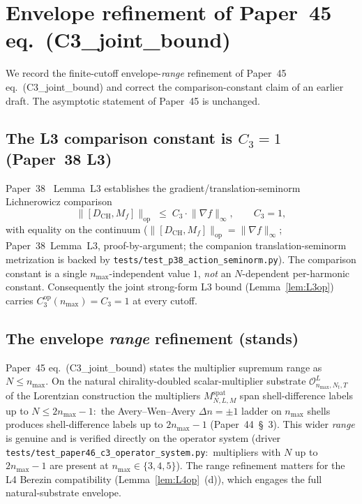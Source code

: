 \documentclass[11pt,a4paper]{article}
\theoremstyle{plain}
\theoremstyle{definition}
\newcommand{\nmax}{n_{\max}}
\newcommand{\Nt}{N_{t}}
\newcommand{\Op}{\mathcal{O}}
\newcommand{\opnorm}[1]{\lVert #1 \rVert_{\mathrm{op}}}
\newcommand{\norm}[1]{\lVert #1 \rVert}
\newcommand{\DCH}{D_{\mathrm{CH}}}
\newcommand{\Cthreeop}{C_{3}^{\mathrm{op}}}
\newcommand{\spat}{\mathrm{spat}}
\begin{document}
\appendix
\section{Envelope refinement of Paper~45 eq.~(C3\_joint\_bound)}
\label{app:correction}

We record the finite-cutoff envelope-\emph{range} refinement of Paper~45
eq.~(C3\_joint\_bound) and correct the comparison-constant claim of an
earlier draft. The asymptotic statement of Paper~45 is unchanged.

\subsection{The L3 comparison constant is $C_{3} = 1$ (Paper~38 L3)}
\label{app:correction_statement}

Paper~38~\cite{paper38} Lemma~L3 establishes the gradient/translation-seminorm
Lichnerowicz comparison
\begin{equation*}
   \opnorm{[\DCH, M_{f}]} \;\le\; C_{3} \cdot \norm{\nabla f}_{\infty},
   \qquad C_{3} = 1,
\end{equation*}
with equality on the continuum ($\opnorm{[\DCH, M_{f}]} = \norm{\nabla f}_{\infty}$;
Paper~38~Lemma~L3, proof-by-argument; the companion translation-seminorm
metrization is backed by \texttt{tests/test\_p38\_action\_seminorm.py}). The comparison constant
is a single $\nmax$-independent value $1$, \emph{not} an $N$-dependent
per-harmonic constant. Consequently the joint strong-form L3 bound
(Lemma~\ref{lem:L3op}) carries $\Cthreeop(\nmax) = C_{3} = 1$ at every cutoff.

\subsection{The envelope \emph{range} refinement (stands)}
\label{app:correction_explanation}

Paper~45 eq.~(C3\_joint\_bound) states the multiplier supremum range as
$N \le \nmax$. On the natural chirality-doubled scalar-multiplier substrate
$\Op^{L}_{\nmax, \Nt, T}$ of the Lorentzian construction the multipliers
$M^{\spat}_{N, L, M}$ span shell-difference labels up to $N \le 2\nmax - 1$:\
the Avery--Wen--Avery $\Delta n = \pm 1$ ladder on $\nmax$ shells produces
shell-difference labels up to $2\nmax - 1$ (Paper~44~\S~3). This wider
\emph{range} is genuine and is verified directly on the operator system
(driver \texttt{tests/test\_paper46\_c3\_operator\_system.py}:\ multipliers with
$N$ up to $2\nmax - 1$ are present at $\nmax \in \{3, 4, 5\}$). The range
refinement matters for the L4 Berezin compatibility (Lemma~\ref{lem:L4op}~(d)),
which engages the full natural-substrate envelope.
\end{document}

